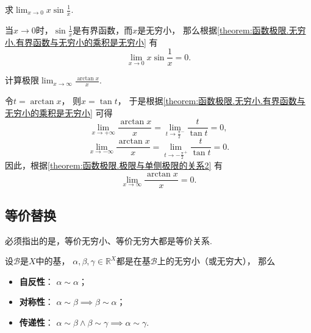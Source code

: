 \begin{example}
求\(\lim_{x\to0} x \sin\frac1x\).
\begin{solution}
当\(x\to0\)时，\(\sin\frac1x\)是有界函数，而\(x\)是无穷小，
那么根据\cref{theorem:函数极限.无穷小.有界函数与无穷小的乘积是无穷小}
有\begin{equation}
	\lim_{x\to0} x \sin\frac1x = 0.
\end{equation}
\end{solution}
\end{example}

\begin{example}
计算极限\(\lim_{x\to\infty} \frac{\arctan x}{x}\).
\begin{solution}
令\(t = \arctan x\)，
则\(x = \tan t\)，
于是根据\cref{theorem:函数极限.无穷小.有界函数与无穷小的乘积是无穷小} 可得\[
	\lim_{x\to+\infty} \frac{\arctan x}{x}
	= \lim_{t\to\frac\pi2^-} \frac{t}{\tan t}
	= 0,
\]\[
	\lim_{x\to-\infty} \frac{\arctan x}{x}
	= \lim_{t\to-\frac\pi2^+} \frac{t}{\tan t}
	= 0.
\]
因此，根据\cref{theorem:函数极限.极限与单侧极限的关系2} 有\begin{equation}
	\lim_{x\to\infty} \frac{\arctan x}{x} = 0.
\end{equation}
\end{solution}
\end{example}

\subsection{等价替换}
必须指出的是，等价无穷小、等价无穷大都是等价关系.
\begin{property}
设\(\mathcal{B}\)是\(X\)中的基，
\(\alpha,\beta,\gamma\in\mathbb{R}^X\)都是在基\(\mathcal{B}\)上的无穷小（或无穷大），
那么\begin{itemize}
	\item {\rm\bf 自反性}：
	\(\alpha \sim \alpha\)；

	\item {\rm\bf 对称性}：
	\(\alpha \sim \beta \implies \beta \sim \alpha\)；

	\item {\rm\bf 传递性}：
	\(\alpha \sim \beta \land \beta \sim \gamma \implies \alpha \sim \gamma\).
\end{itemize}
\end{property}

